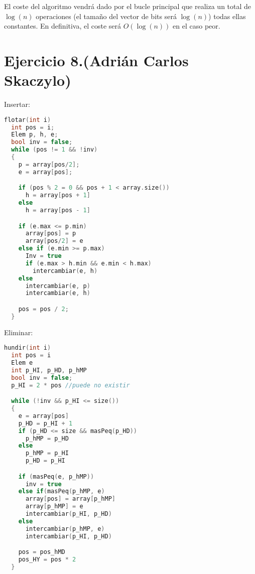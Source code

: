 \documentclass[10pt,a4paper,openright]{book}
\theoremstyle{break}
\begin{document}
El coste del algoritmo vendrá dado por el bucle principal que realiza un total de $\log\left( n \right)$ operaciones (el tamaño del vector de bits será $\log\left( n \right)$) todas ellas constantes. En definitiva, el coste será $O\left( \log\left( n \right) \right)$ en el caso peor.

\section{Ejercicio 8.(Adrián Carlos Skaczylo)}%
\label{sec:ejercicio_8_adrian_carlos_skaczylo_}
Insertar:

\begin{minipage}{\linewidth}
\begin{lstlisting}[language=c++]
flotar(int i) 
  int pos = i;
  Elem p, h, e;
  bool inv = false;
  while (pos != 1 && !inv)
  {
    p = array[pos/2];
    e = array[pos];

    if (pos % 2 = 0 && pos + 1 < array.size()) 
      h = array[pos + 1]
    else 
      h = array[pos - 1]

    if (e.max <= p.min) 
      array[pos] = p
      array[pos/2] = e
    else if (e.min >= p.max) 
      Inv = true
      if (e.max > h.min && e.min < h.max)
        intercambiar(e, h)
    else 
      intercambiar(e, p)
      intercambiar(e, h)

    pos = pos / 2;
  }
\end{lstlisting}
\end{minipage}

Eliminar:

\begin{minipage}{\linewidth}
\begin{lstlisting}[language=c++]
hundir(int i) 
  int pos = i
  Elem e
  int p_HI, p_HD, p_hMP
  bool inv = false;
  p_HI = 2 * pos //puede no existir

  while (!inv && p_HI <= size())
  {
    e = array[pos]
    p_HD = p_HI + 1
    if (p_HD <= size && masPeq(p_HD))
      p_hMP = p_HD
    else 
      p_hMP = p_HI
      p_HD = p_HI

    if (masPeq(e, p_hMP))
      inv = true
    else if(masPeq(p_hMP, e) 
      array[pos] = array[p_hMP]
      array[p_hMP] = e
      intercambiar(p_HI, p_HD)
    else 
      intercambiar(p_hMP, e)
      intercambiar(p_HI, p_HD)

    pos = pos_hMD
    pos_HY = pos * 2
  }
\end{lstlisting}
\end{minipage}
\end{document}
